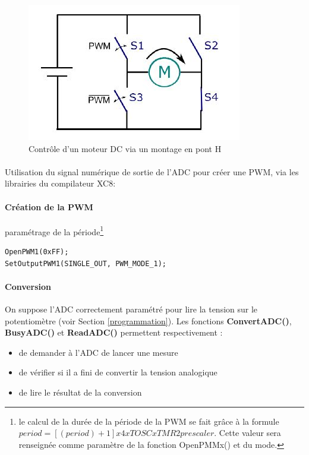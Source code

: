 \begin{figure}[h]
\begin{center}
\begin{framed}
\includegraphics[scale=0.8]{images/pontH.jpg}
\caption{Contrôle d'un moteur DC via un montage en pont H}
\label{pontH}
\end{framed}
\end{center}
\end{figure}

\paragraph{}
Utilisation du signal numérique de sortie de l'ADC pour créer une PWM, via les librairies du compilateur XC8:

\paragraph{Création de la PWM} paramétrage de la période\footnote{
le calcul de la durée de la période de la PWM se fait grâce à la formule $period =[(period ) + 1] x 4 x TOSC x TMR2 prescaler$. Cette valeur sera renseignée comme paramètre de la fonction OpenPMMx() et du mode.}
\begin{lstlisting}
OpenPWM1(0xFF);
SetOutputPWM1(SINGLE_OUT, PWM_MODE_1);
\end{lstlisting}

\paragraph{Conversion} On suppose l'ADC correctement paramétré pour lire la tension sur le potentiomètre (voir Section \ref{programmation}).
Les fonctions \textbf{ConvertADC()}, \textbf{BusyADC()} et \textbf{ReadADC()} permettent respectivement : 
\begin{itemize}
\item de demander à l'ADC de lancer une mesure
\item de vérifier si il a fini de convertir la tension analogique
\item de lire le résultat de la conversion
\end{itemize}

